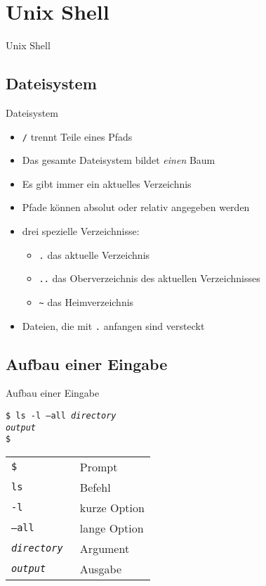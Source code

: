 \section{Unix Shell}
\begin{frame}{Unix Shell}
  \tableofcontents[sectionstyle=show/hide,
                   hideothersubsections]
\end{frame}

\subsection{Dateisystem}
\begin{frame}{Dateisystem}
  \begin{itemize}
    \item \texttt{/} trennt Teile eines Pfads
    \item Das gesamte Dateisystem bildet \emph{einen} Baum
    \item Es gibt immer ein aktuelles Verzeichnis
    \item Pfade können absolut oder relativ angegeben werden
    \item drei spezielle Verzeichnisse:
      \begin{itemize}
        \item \texttt{.} das aktuelle Verzeichnis
        \item \texttt{..} das Oberverzeichnis des aktuellen Verzeichnisses
        \item \texttt{\textasciitilde} das Heimverzeichnis
      \end{itemize}
    \item Dateien, die mit \texttt{.} anfangen sind versteckt
  \end{itemize}
\end{frame}

\subsection{Aufbau einer Eingabe}
\begin{frame}{Aufbau einer Eingabe}
  \begin{singlespace}
    \texttt{\$ ls -l --all \textit{directory}\\
            \textit{output}\\
            \$}
  \end{singlespace}
  \begin{center}
    \begin{tabular}{>{\tt}l l}
      \toprule
      \$                 & Prompt       \\
      ls                 & Befehl       \\
      -l                 & kurze Option \\
      --all              & lange Option \\
      \textit{directory} & Argument     \\
      \textit{output}    & Ausgabe      \\
      \bottomrule
    \end{tabular}
  \end{center}
\end{frame}

